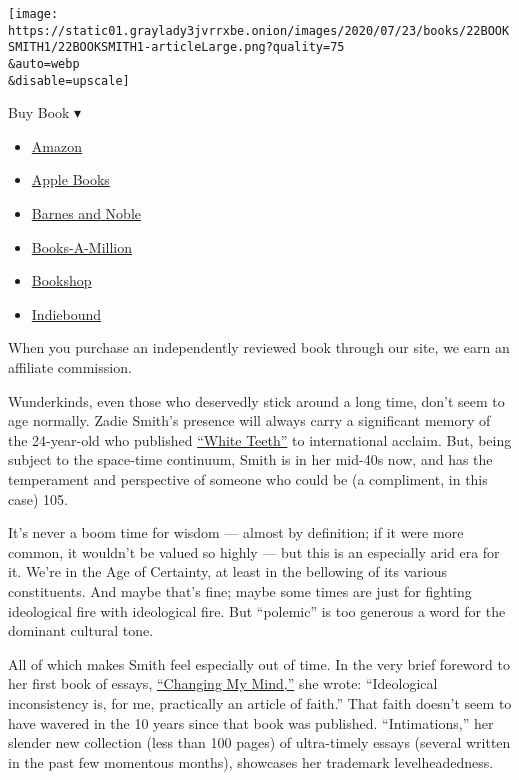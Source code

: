 \texttt{[image: https://static01.graylady3jvrrxbe.onion/images/2020/07/23/books/22BOOKSMITH1/22BOOKSMITH1-articleLarge.png?quality=75\\\&auto=webp\\\&disable=upscale]}

Buy Book ▾

\begin{itemize}
\tightlist
\item
  \href{https://www.amazon.com/gp/search?index=books\&tag=NYTBSREV-20\&field-keywords=Intimations+Zadie+Smith}{Amazon}
\item
  \href{https://du-gae-books-dot-nyt-du-prd.appspot.com/buy?title=Intimations\&author=Zadie+Smith}{Apple
  Books}
\item
  \href{https://www.anrdoezrs.net/click-7990613-11819508?url=https\%3A\%2F\%2Fwww.barnesandnoble.com\%2Fw\%2F\%3Fean\%3D9780593297612}{Barnes
  and Noble}
\item
  \href{https://www.anrdoezrs.net/click-7990613-35140?url=https\%3A\%2F\%2Fwww.booksamillion.com\%2Fp\%2FIntimations\%2FZadie\%2BSmith\%2F9780593297612}{Books-A-Million}
\item
  \href{https://bookshop.org/a/3546/9780593297612}{Bookshop}
\item
  \href{https://www.indiebound.org/book/9780593297612?aff=NYT}{Indiebound}
\end{itemize}

When you purchase an independently reviewed book through our site, we
earn an affiliate commission.

Wunderkinds, even those who deservedly stick around a long time, don't
seem to age normally. Zadie Smith's presence will always carry a
significant memory of the 24-year-old who published
\href{https://archive.nytimes3xbfgragh.onion/www.nytimes3xbfgragh.onion/books/00/04/30/reviews/000430.30quinnt.html}{``White
Teeth''} to international acclaim. But, being subject to the space-time
continuum, Smith is in her mid-40s now, and has the temperament and
perspective of someone who could be (a compliment, in this case) 105.

It's never a boom time for wisdom --- almost by definition; if it were
more common, it wouldn't be valued so highly --- but this is an
especially arid era for it. We're in the Age of Certainty, at least in
the bellowing of its various constituents. And maybe that's fine; maybe
some times are just for fighting ideological fire with ideological fire.
But ``polemic'' is too generous a word for the dominant cultural tone.

All of which makes Smith feel especially out of time. In the very brief
foreword to her first book of essays,
\href{https://www.nytimes3xbfgragh.onion/2010/01/17/books/review/Mishra-t.html}{``Changing
My Mind,''} she wrote: ``Ideological inconsistency is, for me,
practically an article of faith.'' That faith doesn't seem to have
wavered in the 10 years since that book was published. ``Intimations,''
her slender new collection (less than 100 pages) of ultra-timely essays
(several written in the past few momentous months), showcases her
trademark levelheadedness.


